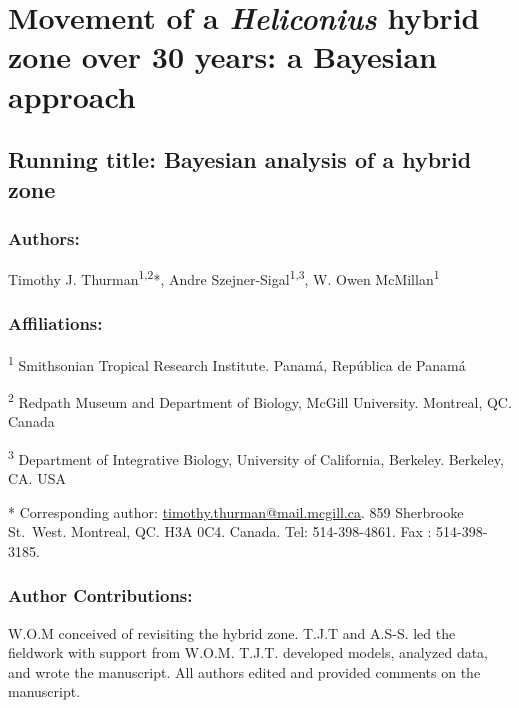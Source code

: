 \documentclass[]{article}
\title{}
\author{}
\date{}
\begin{document}
\section{\texorpdfstring{Movement of a \textit{Heliconius} hybrid zone
over 30 years: a Bayesian
approach}{Movement of a  hybrid zone over 30 years: a Bayesian approach}}\label{movement-of-a-hybrid-zone-over-30-years-a-bayesian-approach}

\subsection{Running title: Bayesian analysis of a hybrid
zone}\label{running-title-bayesian-analysis-of-a-hybrid-zone}

\subsubsection{Authors:}\label{authors}

Timothy J. Thurman\textsuperscript{1,2}*, Andre
Szejner-Sigal\textsuperscript{1,3}, W. Owen McMillan\textsuperscript{1}

\subsubsection{Affiliations:}\label{affiliations}

\textsuperscript{1} Smithsonian Tropical Research Institute. Panamá,
República de Panamá

\textsuperscript{2} Redpath Museum and Department of Biology, McGill
University. Montreal, QC. Canada

\textsuperscript{3} Department of Integrative Biology, University of
California, Berkeley. Berkeley, CA. USA

* Corresponding author:
\href{mailto:timothy.thurman@mail.mcgill.ca}{timothy.thurman@mail.mcgill.ca}.
859 Sherbrooke St.~West. Montreal, QC. H3A 0C4. Canada. Tel:
514-398-4861. Fax : 514-398-3185.

\subsubsection{Author Contributions:}\label{author-contributions}

W.O.M conceived of revisiting the hybrid zone. T.J.T and A.S-S. led the
fieldwork with support from W.O.M. T.J.T. developed models, analyzed
data, and wrote the manuscript. All authors edited and provided comments
on the manuscript.
\end{document}
